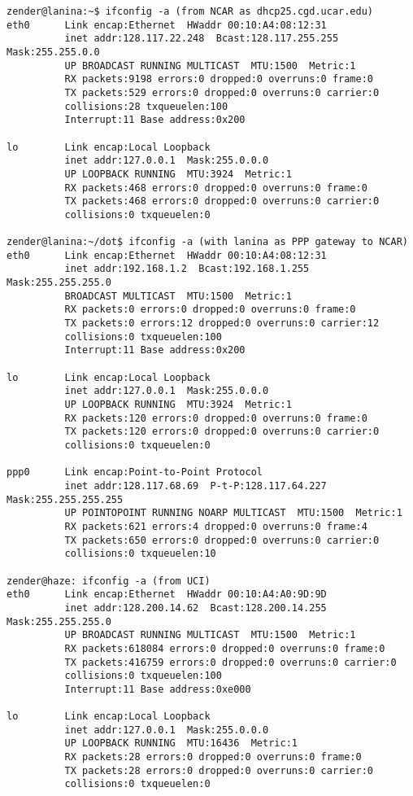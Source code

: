 \documentclass[12pt,twoside]{article}
\begin{document}
\begin{verbatim}
zender@lanina:~$ ifconfig -a (from NCAR as dhcp25.cgd.ucar.edu)
eth0      Link encap:Ethernet  HWaddr 00:10:A4:08:12:31  
          inet addr:128.117.22.248  Bcast:128.117.255.255  Mask:255.255.0.0
          UP BROADCAST RUNNING MULTICAST  MTU:1500  Metric:1
          RX packets:9198 errors:0 dropped:0 overruns:0 frame:0
          TX packets:529 errors:0 dropped:0 overruns:0 carrier:0
          collisions:28 txqueuelen:100 
          Interrupt:11 Base address:0x200 

lo        Link encap:Local Loopback  
          inet addr:127.0.0.1  Mask:255.0.0.0
          UP LOOPBACK RUNNING  MTU:3924  Metric:1
          RX packets:468 errors:0 dropped:0 overruns:0 frame:0
          TX packets:468 errors:0 dropped:0 overruns:0 carrier:0
          collisions:0 txqueuelen:0 

zender@lanina:~/dot$ ifconfig -a (with lanina as PPP gateway to NCAR)
eth0      Link encap:Ethernet  HWaddr 00:10:A4:08:12:31  
          inet addr:192.168.1.2  Bcast:192.168.1.255  Mask:255.255.255.0
          BROADCAST MULTICAST  MTU:1500  Metric:1
          RX packets:0 errors:0 dropped:0 overruns:0 frame:0
          TX packets:0 errors:12 dropped:0 overruns:0 carrier:12
          collisions:0 txqueuelen:100 
          Interrupt:11 Base address:0x200 

lo        Link encap:Local Loopback  
          inet addr:127.0.0.1  Mask:255.0.0.0
          UP LOOPBACK RUNNING  MTU:3924  Metric:1
          RX packets:120 errors:0 dropped:0 overruns:0 frame:0
          TX packets:120 errors:0 dropped:0 overruns:0 carrier:0
          collisions:0 txqueuelen:0 

ppp0      Link encap:Point-to-Point Protocol  
          inet addr:128.117.68.69  P-t-P:128.117.64.227  Mask:255.255.255.255
          UP POINTOPOINT RUNNING NOARP MULTICAST  MTU:1500  Metric:1
          RX packets:621 errors:4 dropped:0 overruns:0 frame:4
          TX packets:650 errors:0 dropped:0 overruns:0 carrier:0
          collisions:0 txqueuelen:10 

zender@haze: ifconfig -a (from UCI)
eth0      Link encap:Ethernet  HWaddr 00:10:A4:A0:9D:9D
          inet addr:128.200.14.62  Bcast:128.200.14.255  Mask:255.255.255.0
          UP BROADCAST RUNNING MULTICAST  MTU:1500  Metric:1
          RX packets:618084 errors:0 dropped:0 overruns:0 frame:0
          TX packets:416759 errors:0 dropped:0 overruns:0 carrier:0
          collisions:0 txqueuelen:100
          Interrupt:11 Base address:0xe000
 
lo        Link encap:Local Loopback
          inet addr:127.0.0.1  Mask:255.0.0.0
          UP LOOPBACK RUNNING  MTU:16436  Metric:1
          RX packets:28 errors:0 dropped:0 overruns:0 frame:0
          TX packets:28 errors:0 dropped:0 overruns:0 carrier:0
          collisions:0 txqueuelen:0
\end{verbatim}
\end{document}

